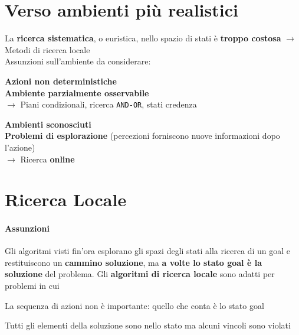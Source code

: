 \documentclass[10pt]{book}
\begin{document}
\section{Verso ambienti più realistici} La \textbf{ricerca sistematica}, o euristica, nello spazio di stati è \textbf{troppo costosa} $\longrightarrow$ Metodi di ricerca locale\\
Assunzioni sull'ambiente da considerare:
\begin{list}{}{}
	\item \textbf{Azioni non deterministiche}\\
	\textbf{Ambiente parzialmente osservabile}\\
	$\longrightarrow$ Piani condizionali, ricerca \texttt{AND-OR}, stati credenza
	\item \textbf{Ambienti sconosciuti}\\
	\textbf{Problemi di esplorazione} (percezioni forniscono nuove informazioni dopo l'azione)\\
	$\longrightarrow$ Ricerca \textbf{online}
\end{list}
\section{Ricerca Locale}
\paragraph{Assunzioni}
Gli algoritmi visti fin'ora esplorano gli spazi degli stati alla ricerca di un goal e restituiscono un \textbf{cammino soluzione}, ma \textbf{a volte lo stato goal è la soluzione} del problema. Gli \textbf{algoritmi di ricerca locale} sono adatti per problemi in cui
\begin{list}{}{}
	\item La sequenza di azioni non è importante: quello che conta è lo stato goal
	\item Tutti gli elementi della soluzione sono nello stato ma alcuni vincoli sono violati
\end{list}
\end{document}
